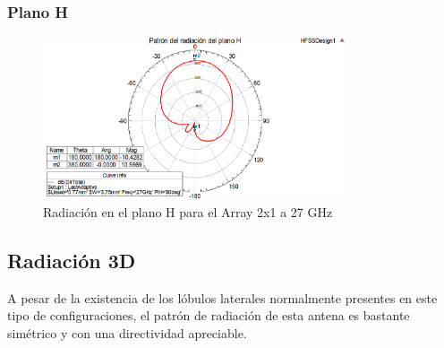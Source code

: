 \subsubsection{Plano H}
\begin{figure}[H]
    \centering
        \includegraphics[width=0.8\textwidth]{archivos/analisis/2x13/5}
        \caption{Radiación en el plano H para el Array 2x1 a 27 GHz}
        \label{fig:H2x13}
\end{figure}

\newpage
\subsection{Radiación 3D}
\par A pesar de la existencia de los lóbulos laterales normalmente presentes en este tipo de configuraciones, el patrón de radiación de esta antena es bastante simétrico y con una directividad apreciable.

